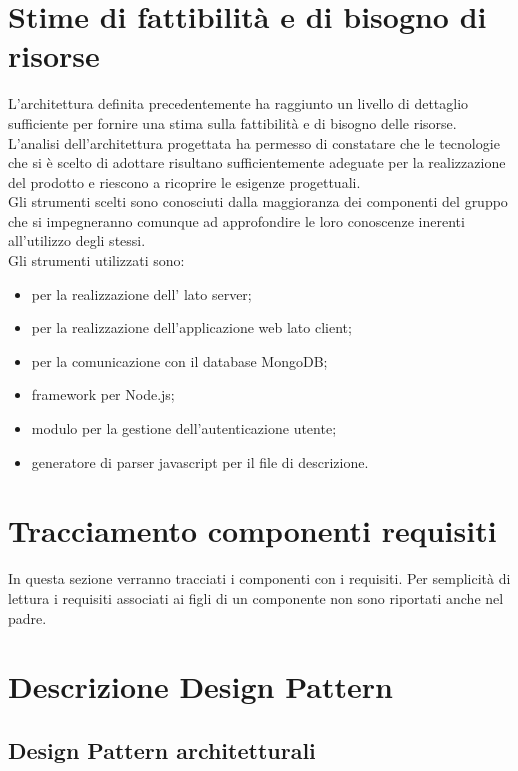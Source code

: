 \newpage
\section{Stime di fattibilità e di bisogno di risorse}
L'architettura definita precedentemente ha raggiunto un livello di dettaglio sufficiente per fornire una stima sulla fattibilità e di bisogno delle risorse.\\
L'analisi dell'architettura progettata ha permesso di constatare che le tecnologie che si è scelto di adottare risultano sufficientemente adeguate per la realizzazione del prodotto e riescono a ricoprire le esigenze progettuali.\\
Gli strumenti scelti sono conosciuti dalla maggioranza dei componenti del gruppo che si impegneranno comunque ad approfondire le loro conoscenze inerenti all'utilizzo degli stessi.\\
Gli strumenti utilizzati sono:
\begin{itemize}
\item {} per la realizzazione dell' lato server;
\item {} per la realizzazione dell'applicazione web lato client;
\item {} per la comunicazione con il database MongoDB;
\item {} framework per Node.js;
\item {} modulo per la gestione dell'autenticazione utente;
\item {} generatore di parser javascript per il file di descrizione.
\end{itemize}

\section{Tracciamento componenti requisiti}
In questa sezione verranno tracciati i componenti con i requisiti. Per semplicità di lettura i requisiti associati ai figli di un componente non sono riportati anche nel padre.


\newpage
\appendix
\section{Descrizione Design Pattern} %

\subsection{Design Pattern architetturali}
